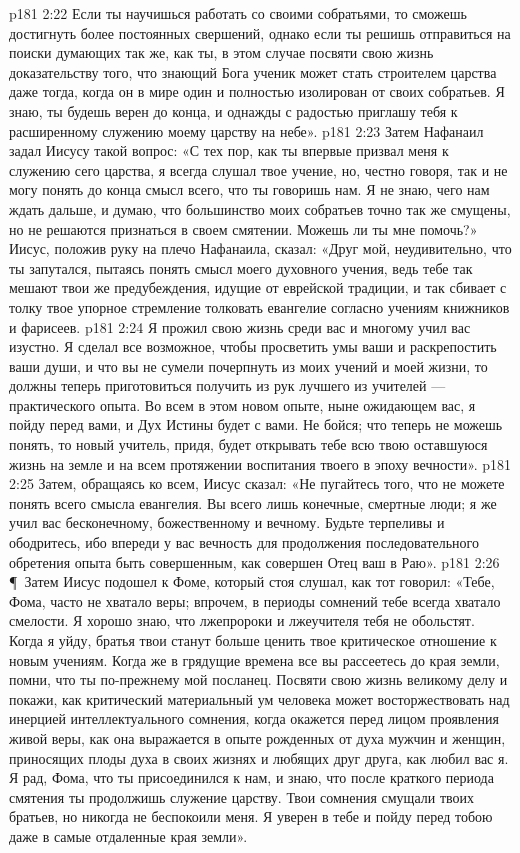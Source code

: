 \vs p181 2:22 Если ты научишься работать со своими собратьями, то сможешь достигнуть более постоянных свершений, однако если ты решишь отправиться на поиски думающих так же, как ты, в этом случае посвяти свою жизнь доказательству того, что знающий Бога ученик может стать строителем царства даже тогда, когда он в мире один и полностью изолирован от своих собратьев. Я знаю, ты будешь верен до конца, и однажды с радостью приглашу тебя к расширенному служению моему царству на небе».
\vs p181 2:23 Затем Нафанаил задал Иисусу такой вопрос: «С тех пор, как ты впервые призвал меня к служению сего царства, я всегда слушал твое учение, но, честно говоря, так и не могу понять до конца смысл всего, что ты говоришь нам. Я не знаю, чего нам ждать дальше, и думаю, что большинство моих собратьев точно так же смущены, но не решаются признаться в своем смятении. Можешь ли ты мне помочь?» Иисус, положив руку на плечо Нафанаила, сказал: «Друг мой, неудивительно, что ты запутался, пытаясь понять смысл моего духовного учения, ведь тебе так мешают твои же предубеждения, идущие от еврейской традиции, и так сбивает с толку твое упорное стремление толковать евангелие согласно учениям книжников и фарисеев.
\vs p181 2:24 Я прожил свою жизнь среди вас и многому учил вас изустно. Я сделал все возможное, чтобы просветить умы ваши и раскрепостить ваши души, и что вы не сумели почерпнуть из моих учений и моей жизни, то должны теперь приготовиться получить из рук лучшего из учителей --- практического опыта. Во всем в этом новом опыте, ныне ожидающем вас, я пойду перед вами, и Дух Истины будет с вами. Не бойся; что теперь не можешь понять, то новый учитель, придя, будет открывать тебе всю твою оставшуюся жизнь на земле и на всем протяжении воспитания твоего в эпоху вечности».
\vs p181 2:25 Затем, обращаясь ко всем, Иисус сказал: «Не пугайтесь того, что не можете понять всего смысла евангелия. Вы всего лишь конечные, смертные люди; я же учил вас бесконечному, божественному и вечному. Будьте терпеливы и ободритесь, ибо впереди у вас вечность для продолжения последовательного обретения опыта быть совершенным, как совершен Отец ваш в Раю».
\vs p181 2:26 \P\ Затем Иисус подошел к Фоме, который стоя слушал, как тот говорил: «Тебе, Фома, часто не хватало веры; впрочем, в периоды сомнений тебе всегда хватало смелости. Я хорошо знаю, что лжепророки и лжеучителя тебя не обольстят. Когда я уйду, братья твои станут больше ценить твое критическое отношение к новым учениям. Когда же в грядущие времена все вы рассеетесь до края земли, помни, что ты по\hyp{}прежнему мой посланец. Посвяти свою жизнь великому делу и покажи, как критический материальный ум человека может восторжествовать над инерцией интеллектуального сомнения, когда окажется перед лицом проявления живой веры, как она выражается в опыте рожденных от духа мужчин и женщин, приносящих плоды духа в своих жизнях и любящих друг друга, как любил вас я. Я рад, Фома, что ты присоединился к нам, и знаю, что после краткого периода смятения ты продолжишь служение царству. Твои сомнения смущали твоих братьев, но никогда не беспокоили меня. Я уверен в тебе и пойду перед тобою даже в самые отдаленные края земли».
